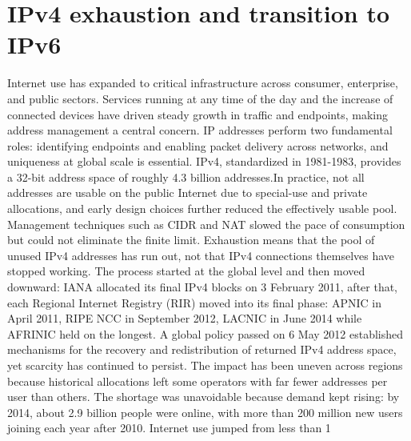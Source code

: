 \section{IPv4 exhaustion and transition to IPv6}
Internet use has expanded to critical infrastructure across consumer, enterprise, and public sectors. Services running at any time of the day and the increase of connected devices have driven steady growth in traffic and endpoints, making address management a central concern\cite{7737362,LEVIN20141059}. IP addresses perform two fundamental roles: identifying endpoints and enabling packet delivery across networks, and uniqueness at global scale is essential\cite{LEVIN20141059}.
IPv4, standardized in 1981-1983, provides a 32-bit address space of roughly 4.3 billion addresses\cite{rfc791}.In practice, not all addresses are usable on the public Internet due to special-use and private allocations, and early design choices further reduced the effectively usable pool\cite{rfc1918,7737362,LEVIN20141059}. Management techniques such as CIDR and NAT slowed the pace of consumption but could not eliminate the finite limit\cite{7737362}.
Exhaustion means that the pool of unused IPv4 addresses has run out, not that IPv4 connections themselves have stopped working. The process started at the global level and then moved downward: IANA allocated its final IPv4 blocks on 3 February 2011, after that, each Regional Internet Registry (RIR) moved into its final phase: APNIC in April 2011, RIPE NCC in September 2012, LACNIC in June 2014 while AFRINIC held on the longest\cite{LEVIN20141059}. A global policy passed on 6 May 2012 established mechanisms for the recovery and redistribution of returned IPv4 address space, yet scarcity has continued to persist\cite{7737362}. The impact has been uneven across regions because historical allocations left some operators with far fewer addresses per user than others\cite{LEVIN20141059}.
The shortage was unavoidable because demand kept rising: by 2014, about 2.9 billion people were online, with more than 200 million new users joining each year after 2010. Internet use jumped from less than 1%


